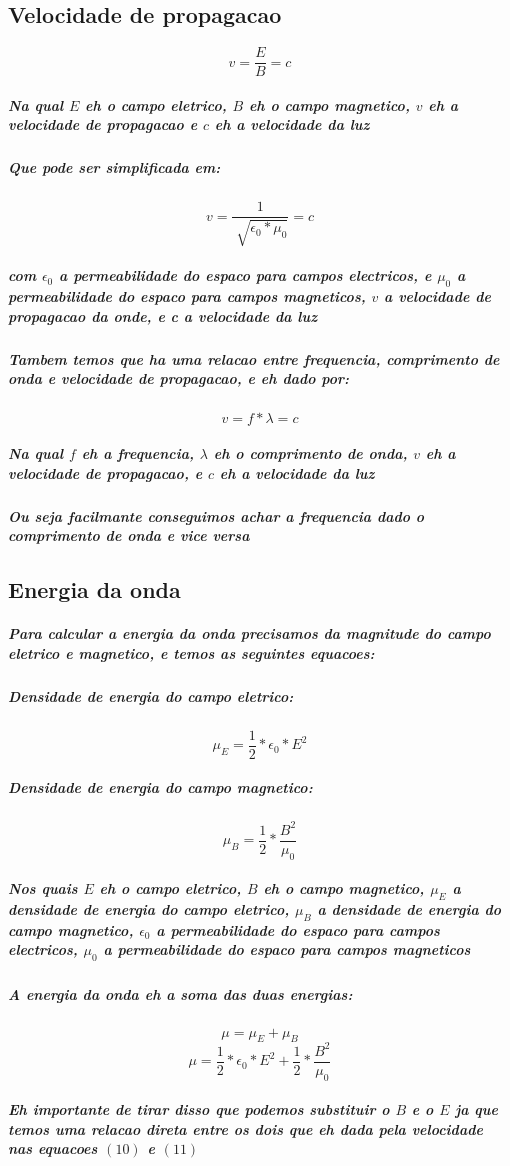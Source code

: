\documentclass[12pt,twoside, a4paper, twocolumn]{article}
\begin{document}
\subsection{Velocidade de propagacao}
\begin{equation}
    v = \frac{E}{B} = c
\end{equation}
\subparagraph*{Na qual $E$ eh o campo eletrico, $B$ eh o campo magnetico, $v$ eh a velocidade de propagacao e $c$ eh a velocidade da luz}
\subparagraph*{Que pode ser simplificada em:}
\begin{equation}
    v = \frac{1}{\sqrt[]{\epsilon_0 * \mu_0}} = c
\end{equation}
\subparagraph*{com $\epsilon_0$ a permeabilidade do espaco para campos electricos, e $\mu_0$ a permeabilidade do espaco para campos magneticos, $v$ a velocidade de propagacao da onde, e c a velocidade da luz}

\subparagraph*{Tambem temos que ha uma relacao entre frequencia, comprimento de onda e velocidade de propagacao, e eh dado por:}

\begin{equation}
    v = f * \lambda = c
\end{equation}

\subparagraph*{Na qual $f$ eh a frequencia, $\lambda$ eh o comprimento de onda, $v$ eh a velocidade de propagacao, e $c$ eh a velocidade da luz}
\subparagraph*{Ou seja facilmante conseguimos achar a frequencia dado o comprimento de onda e vice versa}

\subsection{Energia da onda}
\subparagraph*{Para calcular a energia da onda precisamos da magnitude do campo eletrico e magnetico, e temos as seguintes equacoes:}

\subparagraph*{Densidade de energia do campo eletrico:}
\begin{equation}
    \mu_E = \frac{1}{2} * \epsilon_0 * E^2
\end{equation}

\subparagraph*{Densidade de energia do campo magnetico:}
\begin{equation}
    \mu_B = \frac{1}{2} * \frac{B^2}{\mu_0}
\end{equation}

\subparagraph{Nos quais $E$ eh o campo eletrico, $B$ eh o campo magnetico, $\mu_E$ a densidade de energia do campo eletrico, $\mu_B$ a densidade de energia do campo magnetico, $\epsilon_0$ a permeabilidade do espaco para campos electricos, $\mu_0$ a permeabilidade do espaco para campos magneticos}
\subparagraph{A energia da onda eh a soma das duas energias:}
\begin{equation}
    \mu = \mu_E + \mu_B
\end{equation}
\begin{equation}
    \mu = \frac{1}{2} * \epsilon_0 * E^2 + \frac{1}{2} * \frac{B^2}{\mu_0}
\end{equation}
\subparagraph{Eh importante de tirar disso que podemos substituir o $B$ e o $E$ ja que temos uma relacao direta entre os dois que eh dada pela velocidade nas equacoes $(10)$ e $(11)$}
\end{document}
